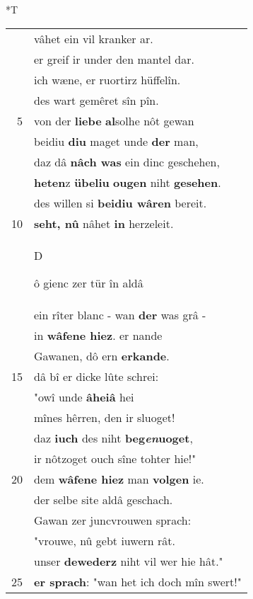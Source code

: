 \documentclass[8pt,a4paper,notitlepage]{article}
\begin{document}
\begin{table}[ht]
\begin{minipage}[t]{0.5\linewidth}
\end{minipage}
\hspace{0.5cm}
\begin{minipage}[t]{0.5\linewidth}
\small
\begin{center}*T
\end{center}
\begin{tabular}{rl}
 & vâhet ein vil kranker ar.\\ 
 & er greif ir under den mantel dar.\\ 
 & ich wæne, er ruortirz hüffelîn.\\ 
 & des wart gemêret sîn pîn.\\ 
5 & von der \textbf{liebe} \textbf{al}solhe nôt gewan\\ 
 & beidiu \textbf{diu} maget unde \textbf{der} man,\\ 
 & daz dâ \textbf{nâch was} ein dinc geschehen,\\ 
 & \textbf{heten}z \textbf{übeliu} \textbf{ougen} niht \textbf{gesehen}.\\ 
 & des willen si \textbf{beidiu wâren} bereit.\\ 
10 & \textbf{seht, nû} nâhet \textbf{in} herzeleit.\\ 
 & \begin{large}D\end{large}ô gienc zer tür în aldâ\\ 
 & ein rîter blanc - wan \textbf{der} was grâ -\\ 
 & in \textbf{wâfene hiez}. er nande\\ 
 & Gawanen, dô ern \textbf{erkande}.\\ 
15 & dâ bî er dicke lûte schrei:\\ 
 & "owî unde \textbf{âheiâ} hei\\ 
 & mînes hêrren, den ir sluoget!\\ 
 & daz \textbf{iuch} des niht \textbf{beg\textit{en}uoget},\\ 
 & ir nôtzoget ouch sîne tohter hie!"\\ 
20 & dem \textbf{wâfene hiez} man \textbf{volgen} ie.\\ 
 & der selbe site aldâ geschach.\\ 
 & Gawan zer juncvrouwen sprach:\\ 
 & "vrouwe, nû gebt iuwern rât.\\ 
 & unser \textbf{dewederz} niht vil wer hie hât."\\ 
25 & \textbf{er sprach}: "wan het ich doch mîn swert!"\\ 

\end{tabular}
\end{minipage}
\end{table}
\end{document}
